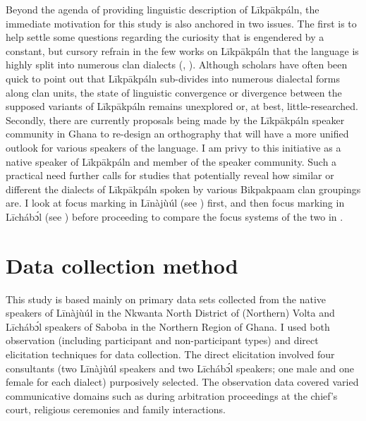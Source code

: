 \documentclass[output=paper,colorlinks,citecolor=brown]{langscibook}
\begin{document}
Beyond the agenda of providing linguistic description of Līkpākpáln, the immediate motivation for this study is also anchored in two issues. The first is to help settle some questions regarding the curiosity that is engendered by a constant, but cursory refrain in the few works on Līkpākpáln that the language is highly split into numerous clan dialects (\citealt[182]{Schwarz2009}, \citealt[107]{Hasselbring2006}). Although scholars have often been quick to point out that Līkpākpáln sub-divides into numerous dialectal forms along clan units, the state of linguistic convergence or divergence between the supposed variants of Līkpākpáln remains unexplored or, at best, little-researched. Secondly, there are currently proposals being made by the Līkpākpáln speaker community in Ghana to re-design an orthography that will have a more unified outlook for various speakers of the language. I am privy to this initiative as a native speaker of Līkpākpáln and member of the speaker community. Such a practical need further calls for studies that potentially reveal how similar or different the dialects of Līkpākpáln spoken by various Bikpakpaam clan groupings are. I look at focus marking in Līnàjùúl (see ) first, and then focus marking in Līcháb\'{ɔ}l (see ) before proceeding to compare the focus systems of the two in .

\section{Data collection method}\label{sec:bisilki:4}

This study is based mainly on primary data sets collected from the native speakers of Līnàjùúl in the Nkwanta North District of (Northern) Volta and Līcháb\'{ɔ}l speakers of Saboba in the Northern Region of Ghana. I used both observation (including participant and non-participant types) and direct elicitation techniques for data collection. The direct elicitation involved four consultants (two Līnàjùúl speakers and two Līcháb\'{ɔ}l speakers; one male and one female for each dialect) purposively selected. The observation data covered varied communicative domains such as during arbitration proceedings at the chief’s court, religious ceremonies and family interactions.
\end{document}
